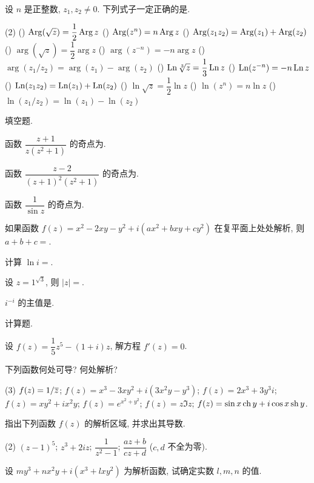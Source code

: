\begin{homework}
\begin{exlist}
			\item 设 $n$ 是正整数, $z_1,z_2\neq0$. 下列式子一定正确的是\fillbrace{}.
				\begin{taskschoice}(2)
					() $\operatorname{Arg}(\sqrt z)=\dfrac12\operatorname{Arg} z$
					() $\operatorname{Arg}(z^n)=n\operatorname{Arg} z$
					() $\operatorname{Arg}(z_1z_2)=\operatorname{Arg}(z_1)+\operatorname{Arg}(z_2)$
					() $\arg(\sqrt z)=\dfrac12\arg z$
					() $\arg(z^{-n})=-n\arg z$
					() $\arg(z_1/z_2)=\arg(z_1)-\arg(z_2)$
					() $\operatorname{Ln}\sqrt[3] z=\dfrac13\operatorname{Ln} z$
					() $\operatorname{Ln}(z^{-n})=-n\operatorname{Ln} z$
					() $\operatorname{Ln}(z_1z_2)=\operatorname{Ln}(z_1)+\operatorname{Ln}(z_2)$
					() $\ln\sqrt z=\dfrac12\ln z$
					() $\ln(z^n)=n\ln z$
					() $\ln(z_1/z_2)=\ln(z_1)-\ln(z_2)$
				\end{taskschoice}
		\end{exlist}
	\item 填空题.
		\begin{exlist}
			\item 函数 $\dfrac{z+1}{z(z^2+1)}$ 的奇点为\fillblank{}.
			\item 函数 $\dfrac{z-2}{(z+1)^2(z^2+1)}$ 的奇点为\fillblank{}.
			\item 函数 $\dfrac{1}{\sin z}$ 的奇点为\fillblank{}.
			\item 如果函数 $f(z)=x^2-2xy-y^2+i(ax^2+bxy+cy^2)$ 在复平面上处处解析, 则 $a+b+c=$\fillblank{}.
			\item 计算 $\ln i=$\fillblank[2cm][3mm]{}.
			\item 设 $z=1^{\sqrt3}$, 则 $|z|=$\fillblank{}.
			\item $i^{-i}$ 的主值是\fillblank{}.
		\end{exlist}
  \item 计算题.
		\begin{exlist}
			\item 设 $f(z)=\dfrac15z^5-(1+i)z$, 解方程 $f'(z)=0$.
			\item 下列函数何处可导? 何处解析?
				\begin{tasks}(3)
					\task $f(z)=1/\overline z$;
					\task* $f(z)=x^3-3xy^2+i(3x^2y-y^3)$;
					\task $f(z)=2x^3+3y^3i$;
					\task $f(z)=xy^2+ix^2y$;
					\task $f(z)=e^{x^2+y^2}$;
					\task $f(z)=z\Im z$;
					\task* $f(z)=\sin x\operatorname{ch} y+i\cos x\operatorname{sh} y$.
				\end{tasks}
			\item 指出下列函数 $f(z)$ 的解析区域, 并求出其导数.
				\begin{tasks}(2)
					\task $(z-1)^5$;
					\task $z^3+2iz$;
					\task $\dfrac1{z^2-1}$;
					\task $\dfrac{az+b}{cz+d}$ ($c,d$ 不全为零).
				\end{tasks}
			\item 设 $my^3+nx^2y+i(x^3+lxy^2)$ 为解析函数, 试确定实数 $l,m,n$ 的值.

\end{exlist}
\end{homework}
